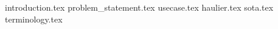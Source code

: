 {introduction.tex}
{problem_statement.tex}
{usecase.tex}
{haulier.tex}
{sota.tex}
{terminology.tex}
